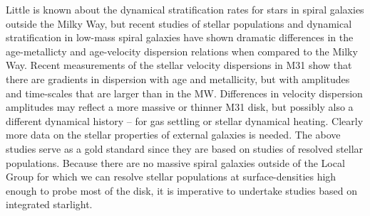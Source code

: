 Little is known about the dynamical stratification rates for stars in
spiral galaxies outside the Milky Way, but recent studies of stellar
populations and dynamical stratification in low-mass spiral galaxies
\citep{Seth05a,Bernard15} have shown dramatic differences in the
age-metallicty and age-velocity dispersion relations when compared to
the Milky Way. Recent measurements of the stellar velocity dispersions
in M31 \citep{Dorman15} show that there are gradients in dispersion
with age and metallicity, but with amplitudes and time-scales that are
larger than in the MW. Differences in velocity dispersion amplitudes
may reflect a more massive or thinner M31 disk, but possibly also a
different dynamical history -- for gas settling or stellar dynamical
heating. Clearly more data on the stellar properties of external
galaxies is needed. The above studies serve as a gold standard since
they are based on studies of resolved stellar populations. Because
there are no massive spiral galaxies outside of the Local Group for
which we can resolve stellar populations at surface-densities high
enough to probe most of the disk, it is imperative to undertake
studies based on integrated starlight.

